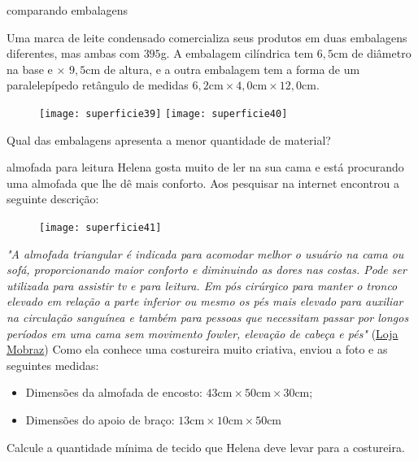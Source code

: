 \begin{task}{comparando embalagens}

Uma marca de leite condensado comercializa seus produtos em duas embalagens diferentes, mas ambas com $395$g. A embalagem cilíndrica tem $6{,}5$cm de diâmetro na base e $\times$ $9{,}5$cm de altura, e a outra embalagem tem a forma de um paralelepípedo retângulo de medidas $6{,}2\text{cm}\times4{,}0\text{cm}\times12{,}0\text{cm}$.

\begin{figure}[H]
\centering

\texttt{[image: superficie39]}\hspace{1cm}
\texttt{[image: superficie40]}

\end{figure}

Qual das embalagens apresenta a menor quantidade de material?

\end{task}
\begin{task}{almofada para leitura}
Helena gosta muito de ler na sua cama e está procurando uma almofada que lhe dê  mais conforto. Aos pesquisar na internet encontrou a seguinte descrição:

\begin{figure}
\vspace{-1em}
\texttt{[image: superficie41]}
\end{figure}
\textit{"A almofada triangular é indicada para acomodar melhor o usuário na cama ou sofá, proporcionando maior conforto e diminuindo as dores nas costas. Pode ser utilizada para assistir tv e para leitura. Em pós cirúrgico para manter o tronco elevado em relação a parte inferior ou mesmo os pés mais elevado para auxiliar na circulação sanguínea e também para pessoas que necessitam passar por longos períodos em uma cama sem movimento fowler, elevação de cabeça e pés"}
\flushright
(\href{https://www.mobraz.com.br/produto/almofada-triangular-para-leitura-perfetto}{Loja Mobraz})
\justify
\clearpage
Como ela conhece uma costureira muito criativa, enviou a foto e as seguintes medidas:
\begin{itemize}
  \item Dimensões da almofada de encosto: $43\text{cm}\times50\text{cm}\times30\text{cm}$;
  \item Dimensões do apoio de braço: $13\text{cm}\times10\text{cm}\times50\text{cm}$
\end{itemize}
\noindent Calcule a quantidade mínima de tecido que Helena deve levar para a costureira.
\end{task}

